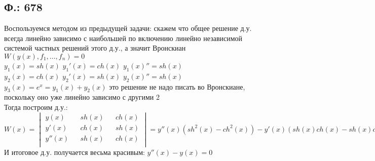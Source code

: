 \documentclass{article}
\begin{document}
\subsection{Ф.: 678}
Воспользуемся методом из предыдущей задачи: скажем что общее решение д.у. всегда линейно зависимо с наибольшей по включению линейно независимой системой частных решений этого д.у., а значит Вронскиан $W(y(x),f_1,\ldots, f_n)=0$\\
$y_1(x)=sh(x)$ $y_1'(x)=ch(x)$ $y_1(x)''=sh(x)$ \\
$y_2(x)=ch(x)$ $y_2'(x)=sh(x)$ $y_2(x)''=sh(x)$ \\
$y_3(x)=e^x=y_1(x)+y_2(x)$ это решение не надо писать во Вронскиане, поскольку оно уже линейно зависимо с другими 2\\
Тогда построим д.у.:
\begin{equation}
    W(x)
    =
    \begin{vmatrix}
     y(x) && sh(x) && ch(x)\\
     y'(x) && ch(x) && sh(x)\\
     y''(x) && sh(x) && ch(x)\\
    \end{vmatrix}
    =y''(x) (sh^2(x)-ch^2(x)) - y'(x) (sh(x)ch(x)-sh(x)ch(x)) + y(x) (ch^2(x)-sh^2(x))
    =0
\end{equation}
И итоговое д.у. получается весьма красивым: $y''(x)-y(x)=0$
\end{document}
